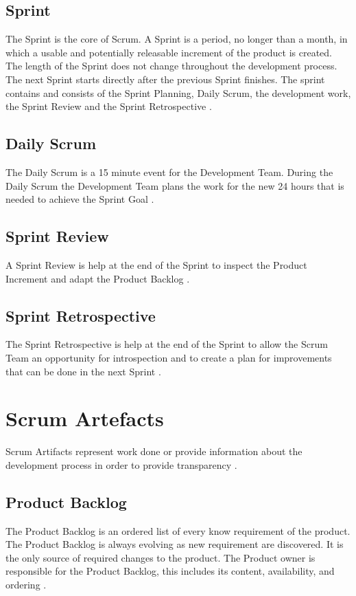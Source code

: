 \subsection{Sprint}
The Sprint is the core of Scrum. A Sprint is a period, no longer than a month, in which 
a usable and potentially releasable increment of the product is created. The length
of the Sprint does not change throughout the development process. The next Sprint 
starts directly after the previous Sprint finishes. The sprint contains and consists of the 
Sprint Planning, Daily Scrum, the development work, the Sprint Review and the 
Sprint Retrospective \parencite{TheScrumGuide}.

\subsection{Daily Scrum}
The Daily Scrum is a 15 minute event for the Development Team. During the Daily 
Scrum the Development Team plans the work for the new 24 hours that is needed
to achieve the Sprint Goal  \parencite{TheScrumGuide}.

\subsection{Sprint Review}
A Sprint Review is help at the end of the Sprint to inspect the Product Increment 
and adapt the Product Backlog  \parencite{TheScrumGuide}.

\subsection{Sprint Retrospective}
The Sprint Retrospective is help at the end of the Sprint to allow the Scrum Team
an opportunity for introspection and to create a plan for improvements that can be 
done in the next Sprint  \parencite{TheScrumGuide}.

\section{Scrum Artefacts}
Scrum Artifacts represent work done or provide information about the development 
process in order to provide transparency  \parencite{TheScrumGuide}.

\subsection{Product Backlog}
The Product Backlog is an ordered list of every know requirement of the product.
The Product Backlog is always evolving as new requirement are discovered. It is 
the only source of required changes to the product. The Product owner is 
responsible for the Product Backlog, this includes its content, availability, 
and ordering \parencite{TheScrumGuide}.

